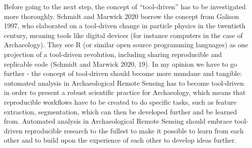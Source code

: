 \documentclass[
]{article}
\begin{document}
Before going to the next step, the concept of ``tool-driven'' has to be investigated more thoroughly. Schmidt and Marwick 2020 borrow the concept from Galison 1997, who elaborated on a tool-driven change in particle physics in the twentieth century, meaning tools like digital devices (for instance computers in the case of Archaeology). They see R (or similar open source programming languages) as one projection of a tool-driven revolution, including sharing reproducible and replicable code (Schmidt and Marwick 2020, 19). In my opinion we have to go further - the concept of tool-driven should become more mundane and tangible: automated analysis in Archaeological Remote Sensing has to become tool-driven in order to present a robust scientific practice for Archaeology, which means that reproducible workflows have to be created to do specific tasks, such as feature extraction, segmentation, which can then be developed further and be learned from. Automated analysis in Archaeological Remote Sensing should embrace tool-driven reproducible research to the fullest to make it possible to learn from each other and to build upon the experience of each other to develop ideas further.
\end{document}
